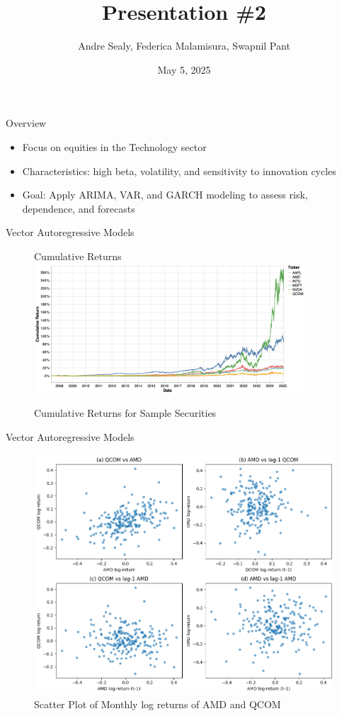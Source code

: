 \documentclass{beamer}[9pt]
\title{Presentation \#2}
\author{Andre Sealy, Federica Malamisura, Swapnil Pant}
\institute{Stevens Institute of Technology}
\date{May 5, 2025}
\begin{document}
	
	\frame{\titlepage}
	
	\begin{frame}{Overview}
		\begin{itemize}
			\item Focus on equities in the Technology sector
			\item Characteristics: high beta, volatility, and sensitivity to innovation cycles
			\item Goal: Apply ARIMA, VAR, and GARCH modeling to assess risk, dependence, and forecasts
		\end{itemize}
	\end{frame}
	

\begin{frame}{Vector Autoregressive Models}
	\begin{figure}{Cumulative Returns}
		\centering
		\includegraphics[width=0.9\textwidth]{plots/sample_stocks.png} %
		\caption{Cumulative Returns for Sample Securities}
	\end{figure}
\end{frame}

\begin{frame}{Vector Autoregressive Models}
	\begin{figure}[!h]
		\centering
		\includegraphics[width=0.8\linewidth]{plots/amd_qcom_scatter.png}
		\caption{Scatter Plot of Monthly log returns of AMD and QCOM}
		\label{fig:amd_qcom_scatter}
	\end{figure}
\end{frame}
\end{document}
